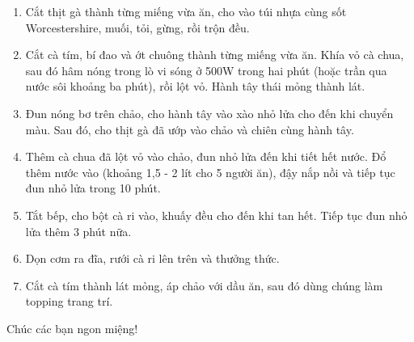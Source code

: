 \documentclass[../main.tex]{subfiles}
\begin{document}
\begin{enumerate}
    \item Cắt thịt gà thành từng miếng vừa ăn, cho vào túi nhựa cùng sốt Worcestershire, muối, tỏi, gừng, rồi trộn đều.
    \item Cắt cà tím, bí đao và ớt chuông thành từng miếng vừa ăn.
          Khía vỏ cà chua, sau đó hâm nóng trong lò vi sóng ở 500W trong hai phút (hoặc trần qua nước sôi khoảng ba phút), rồi lột vỏ.
          Hành tây thái mỏng thành lát.
    \item Đun nóng bơ trên chảo, cho hành tây vào xào nhỏ lửa cho đến khi chuyển màu.
          Sau đó, cho thịt gà đã ướp vào chảo và chiên cùng hành tây.
    \item Thêm cà chua đã lột vỏ vào chảo, đun nhỏ lửa đến khi tiết hết nước.
          Đổ thêm nước vào (khoảng 1,5 - 2 lít cho 5 người ăn), đậy nắp nồi và tiếp tục đun nhỏ lửa trong 10 phút.
    \item Tắt bếp, cho bột cà ri vào, khuấy đều cho đến khi tan hết.
          Tiếp tục đun nhỏ lửa thêm 3 phút nữa.
    \item Dọn cơm ra đĩa, rưới cà ri lên trên và thưởng thức.
    \item Cắt cà tím thành lát mỏng, áp chảo với dầu ăn, sau đó dùng chúng làm topping trang trí.
\end{enumerate}

\begin{center}
    Chúc các bạn ngon miệng!
\end{center}

\end{document}
